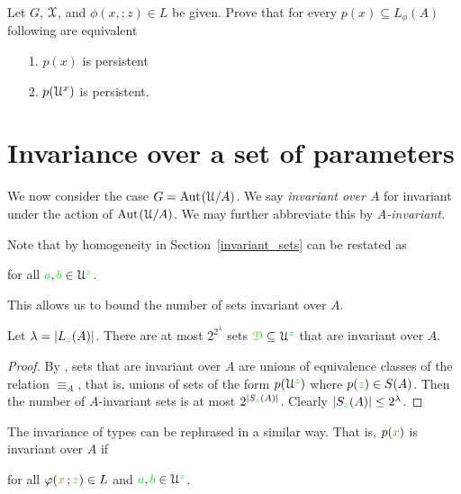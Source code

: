 \begin{exercise}\label{ex_persistent_types}
  Let $G$, $\EuScript X$, and $\phi(x,;z)\in L$ be given.
  Prove that for every $p(x)\subseteq L_\phi(A)$ following are equivalent
  \begin{itemize}
    \item[1.] $p(x)$ is persistent
    \item[2.] $p(\EuScript U^x)$ is persistent.
  \end{itemize}
\end{exercise}

\section{Invariance over a set of parameters}

We now consider the case $G={\rm Aut\kern.15ex}(\EuScript U/A)$.
We say \emph{invariant over $A$\/} for invariant under the action of ${\rm Aut\kern.15ex}(\EuScript U/A)$.
We may further abbreviate this by \emph{$A$-invariant.}

Note that by homogeneity  in Section~\ref{invariant_sets} can  be restated as

\hfill for all ${\color{green} a},{\color{green} b}\in\EuScript U^{\color{green} z}$.

This allows us to bound the number of sets invariant over $A$.

\begin{proposition}\label{prop_numberIS}
Let $\lambda=|L_{\color{green} z}(A)|$.
There are at most $2^{2^{\lambda}}$ sets ${\color{green}\EuScript D}\subseteq\EuScript U^{\color{green} z}$ that are invariant over $A$.
\end{proposition}
\begin{proof}
  By , sets that are invariant over $A$ are unions of equivalence classes of the relation $\equiv_A$, that is, unions of sets of the form $p(\EuScript U^{\color{green} z})$ where $p({\color{green} z})\in S\/(A)$.
  Then the number of $A$-invariant sets is at most $2^{|S_{\color{green} z}(A)|}$.
  Clearly $|S_{\color{green} z}(A)|\le 2^\lambda$.
\end{proof} 

The invariance of types can be rephrased in a similar way.
That is, $p({\color{brown} x})$ is invariant over $A$ if 

\hfill for all $\varphi({\color{brown} x}\,;{\color{green} z})\in L$ and ${\color{green} a},{\color{green} b}\in\EuScript U^{\color{green} z}$.

